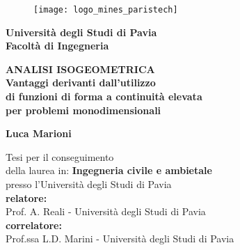 

\newpage
\pagestyle{empty}
\begin{figure}[h]
\centering
\texttt{[image: logo\_mines\_paristech]}
\end{figure}
\vspace{0.25cm}
\begin{center}
\fontsize{10pt}{10pt}\selectfont
    \textbf{Universit\`{a} degli Studi di Pavia}\\
    \vspace{0.3cm}
    \fontsize{8pt}{8pt}\selectfont
    \textbf{Facolt\`{a} di Ingegneria}\\
\end{center}



\vspace{1cm}

\begin{center}
    \fontsize{20pt}{20pt}\selectfont
    \textbf{ANALISI ISOGEOMETRICA}\\
    \fontsize{16pt}{16pt}
    \textbf{Vantaggi derivanti dall'utilizzo}\\
    \textbf{di funzioni di forma a continuit\`{a} elevata}\\
    \textbf{per problemi monodimensionali}\\
    
    \vspace{0.75cm}

    \fontsize{14pt}{14pt}\selectfont
    \vspace{0.5cm}
    \textbf{Luca Marioni}
    \vspace{0.5cm}

    \fontsize{12pt}{12pt}\selectfont
      Tesi per il conseguimento \\della laurea in:
    \vspace{0.25cm} 
    \textbf{Ingegneria civile e ambietale}\\ 
    presso l'Universit\`{a} degli Studi di Pavia\\ 
 \fontsize{12pt}{12pt}\selectfont
      \textbf{relatore:}\\ 
      Prof. A. Reali - Universit\`{a} degli Studi di Pavia\\
 
      \fontsize{12pt}{12pt}\selectfont
      \textbf{correlatore:}\\ 
      Prof.ssa L.D. Marini - Universit\`{a}  degli Studi di Pavia\\



    \end{center}
\cleardoublepage

